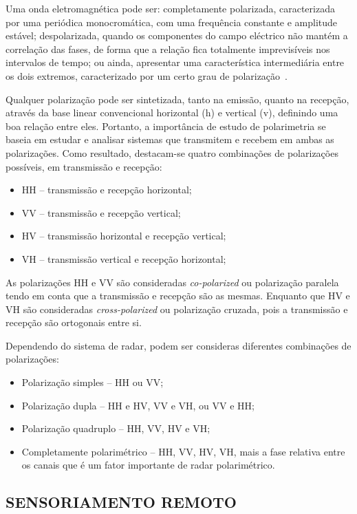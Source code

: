 \documentclass[a4paper,12pt]{article}
\begin{document}
Uma onda eletromagnética pode ser: completamente polarizada, caracterizada por uma periódica monocromática, com uma frequência constante e amplitude estável; despolarizada, quando os componentes do campo eléctrico não mantém a correlação das fases, de forma que a relação fica totalmente imprevisíveis nos intervalos de tempo; ou ainda, apresentar uma característica intermediária entre os dois extremos, caracterizado por um certo grau de polarização~\cite{nilosergio2012}.

Qualquer polarização pode ser sintetizada, tanto na emissão, quanto na recepção, através da base linear convencional horizontal (h) e vertical (v), definindo uma boa relação entre eles. Portanto, a importância de estudo de polarimetria se baseia em estudar e analisar sistemas que transmitem e recebem em ambas as polarizações. Como resultado, destacam-se quatro combinações de polarizações possíveis, em transmissão e recepção:
\begin{itemize}
    \item HH – transmissão e recepção horizontal;
    \item VV – transmissão e recepção vertical;
    \item HV – transmissão horizontal e recepção vertical;
    \item VH – transmissão vertical e recepção horizontal;
\end{itemize}

As polarizações HH e VV são consideradas \textit{co-polarized} ou polarização paralela tendo em conta que a transmissão e recepção são as mesmas. Enquanto que HV e VH são consideradas \textit{cross-polarized} ou polarização cruzada, pois a transmissão e recepção são ortogonais entre si.

Dependendo do sistema de radar, podem ser consideras diferentes combinações de polarizações:
\begin{itemize}
    \item Polarização simples – HH ou VV;
    \item Polarização dupla – HH e HV, VV e VH, ou VV e HH;
    \item Polarização quadruplo  – HH, VV, HV e VH;
    \item Completamente polarimétrico –  HH, VV, HV, VH, mais a fase relativa entre os canais que é um fator importante de radar polarimétrico.
\end{itemize}

\subsection{SENSORIAMENTO REMOTO}
\label{subsec:SR}
\end{document}
